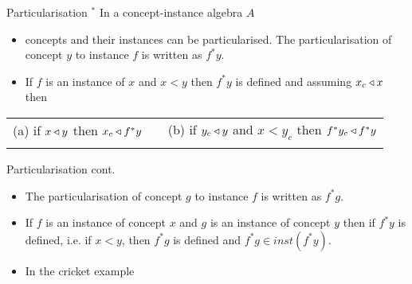 \begin{frame}{Particularisation $^*$}
In a concept-instance algebra $A$
\begin{itemize}
\item concepts and their instances can be particularised. The particularisation of concept $y$ to instance $f$ is written as $f^*y$. 
\item If $f$ is an instance of $x$ and $x < y$ then $f^*y$ is defined and assuming $x_c \triangleleft x$ then 
\end{itemize}
\medskip
\pause
\begin{tabular} {c p{0.2cm} c}
(a) if $x \triangleleft y$ then $x_c \triangleleft f^*y$    &&   (b) if $y_c \triangleleft y$ and $x <y_c$ then $f^*y_c \triangleleft f^*y$ \\
&& \\
\end{tabular}
\end{frame}

\begin{frame}{Particularisation cont.}
\begin{itemize}
\item The particularisation of concept $g$ to instance $f$ is written as $f^*g$.
\item If $f$ is an instance of concept $x$ and  $g$ is an instance of concept $y$
then if $f^*y$ is defined, i.e. if $x < y$, then $f^*g$ is defined and $f^*g \in inst(f^*y)$.
\medskip
\pause
\item In the cricket example 

\end{itemize}
\end{frame}

\iffalse
\begin{frame}{Particularisation cont. (2)}
At this point it follows that if $y \base z_1 ... \base z_m \base z$ and $g$ is a instance of $z$ then we have:
 
\end{frame}


\begin{frame}{Example}

\end{frame}
\fi






